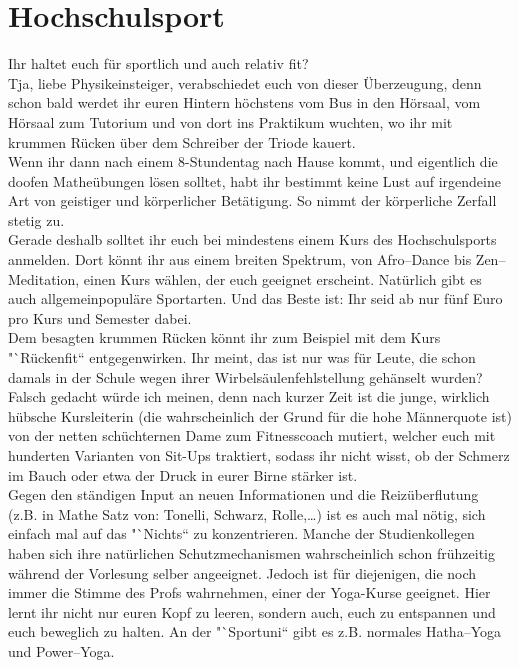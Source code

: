 \section{Hochschulsport}

Ihr haltet euch für sportlich und auch relativ fit?\\
Tja, liebe Physikeinsteiger, verabschiedet euch von dieser Überzeugung, denn schon bald werdet ihr euren Hintern höchstens vom Bus in den Hörsaal, vom Hörsaal zum Tutorium und von dort ins Praktikum wuchten, wo ihr mit krummen Rücken über dem Schreiber der Triode kauert. \\
Wenn ihr dann nach einem 8-Stundentag nach Hause kommt, und eigentlich die doofen Matheübungen lösen solltet, habt ihr bestimmt keine Lust auf irgendeine Art von geistiger und körperlicher Betätigung.
So nimmt der körperliche Zerfall stetig zu.\\
Gerade deshalb solltet ihr euch bei mindestens einem Kurs des Hochschulsports anmelden.
Dort könnt ihr aus einem breiten Spektrum, von Afro--Dance bis Zen--Meditation, einen Kurs wählen, der euch geeignet erscheint.
Natürlich gibt es auch allgemeinpopuläre Sportarten.
Und das Beste ist:
Ihr seid ab nur fünf Euro pro Kurs und Semester dabei. \\
Dem besagten krummen Rücken könnt ihr zum Beispiel mit dem Kurs "`Rückenfit`` entgegenwirken.
Ihr meint, das ist nur was für Leute, die schon damals in der Schule wegen ihrer Wirbelsäulenfehlstellung gehänselt wurden?
Falsch gedacht würde ich meinen, denn nach kurzer Zeit ist die junge, wirklich hübsche Kursleiterin (die wahrscheinlich der Grund für die hohe Männerquote ist) von der netten schüchternen Dame zum Fitnesscoach mutiert, welcher euch mit hunderten Varianten von Sit-Ups traktiert, sodass ihr nicht wisst, ob der Schmerz im Bauch oder etwa der Druck in eurer Birne stärker ist.\\
Gegen den ständigen Input an neuen Informationen und die Reizüberflutung (z.B. in Mathe Satz von: Tonelli, Schwarz, Rolle,\ldots ) ist es auch mal nötig, sich einfach mal auf das "`Nichts`` zu konzentrieren.
Manche der Studienkollegen haben sich ihre natürlichen Schutzmechanismen wahrscheinlich schon frühzeitig während der Vorlesung selber angeeignet.
Jedoch ist für diejenigen, die noch immer die Stimme des Profs wahrnehmen, einer der Yoga-Kurse geeignet.
Hier lernt ihr nicht nur euren Kopf zu leeren, sondern auch, euch zu entspannen und euch beweglich zu halten.
An der "`Sportuni`` gibt es z.B. normales Hatha--Yoga und Power--Yoga. \\
